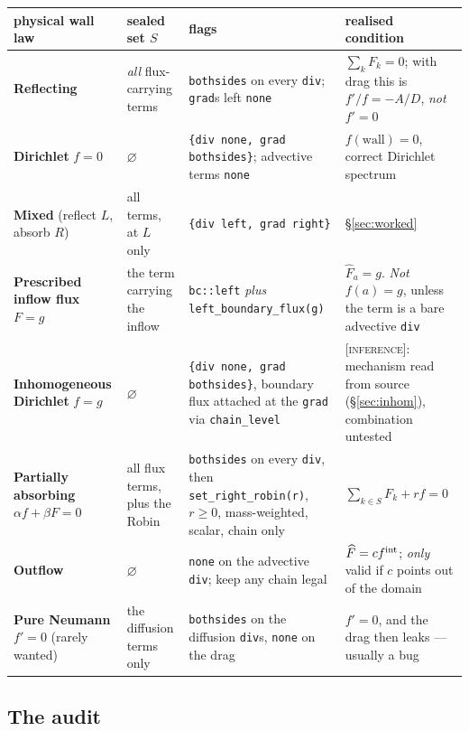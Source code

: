 \documentclass[10pt]{article}
\newcommand{\code}[1]{\texttt{#1}}
\newcommand{\hF}{\widehat{F}}
\newcommand{\INF}{\textcolor{red!60!black}{\textsc{[inference]}}}
\begin{document}
\begin{center}\small
\begin{tabular}{@{}p{2.5cm}p{2.6cm}p{4.6cm}p{5.2cm}@{}}
\toprule
physical wall law & sealed set $S$ & flags & realised condition \\
\midrule
\textbf{Reflecting} & \emph{all} flux-carrying terms &
  \code{bothsides} on every \code{div}; \code{grad}s left \code{none} &
  $\sum_kF_k=0$; with drag this is $f'/f=-A/D$, \emph{not} $f'=0$ \\
\textbf{Dirichlet} $f=0$ & $\varnothing$ &
  \code{\{div none, grad bothsides\}}; advective terms \code{none} &
  $f(\text{wall})=0$, correct Dirichlet spectrum \\
\textbf{Mixed} (reflect $L$, absorb $R$) & all terms, at $L$ only &
  \code{\{div left, grad right\}} & \S\ref{sec:worked} \\
\textbf{Prescribed inflow flux} $F=g$ & the term carrying the inflow &
  \code{bc::left} \emph{plus} \code{left\_boundary\_flux(g)} &
  $\hF_a=g$. \emph{Not} $f(a)=g$, unless the term is a bare advective \code{div} \\
\textbf{Inhomogeneous Dirichlet} $f=g$ & $\varnothing$ &
  \code{\{div none, grad bothsides\}}, boundary flux attached at the \code{grad}
  via \code{chain\_level} & \INF{}: mechanism read from source
  (\S\ref{sec:inhom}), combination untested \\
\textbf{Partially absorbing} $\alpha f+\beta F=0$ & all flux terms, plus the Robin &
  \code{bothsides} on every \code{div}, then \code{set\_right\_robin(r)}, $r\ge0$,
  mass-weighted, scalar, chain only & $\sum_{k\in S}F_k+rf=0$ \\
\textbf{Outflow} & $\varnothing$ &
  \code{none} on the advective \code{div}; keep any chain legal &
  $\hF=cf^{\rm int}$; \emph{only} valid if $c$ points out of the domain \\
\textbf{Pure Neumann} $f'=0$ (rarely wanted) & the diffusion terms only &
  \code{bothsides} on the diffusion \code{div}s, \code{none} on the drag &
  $f'=0$, and the drag then leaks --- usually a bug \\
\bottomrule
\end{tabular}
\end{center}

\subsection{The audit}
\label{sec:audit}
\end{document}
